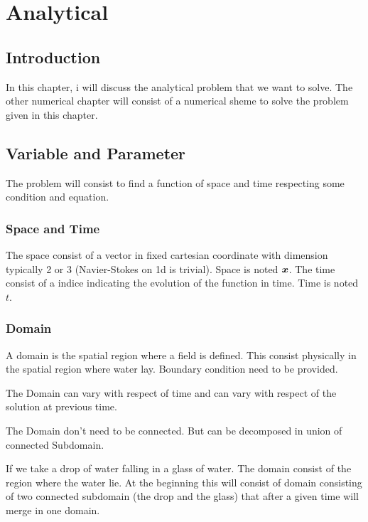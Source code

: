 \chapter{Analytical}
\minitoc
\section{Introduction}
In this chapter, i will discuss the analytical problem that we want to solve.
The other numerical chapter will consist of a numerical sheme to solve the problem given in this chapter.

\section{Variable and Parameter}

The problem will consist to find a function of space and time respecting some condition and equation.

\subsection{Space and Time}

The space consist of a vector in fixed cartesian coordinate with dimension typically 2 or 3 (Navier-Stokes on 1d is trivial).
Space is noted ${\boldsymbol {x}}$.
The time consist of a indice indicating the evolution of the function in time.
Time is noted $t$.

\subsection{Domain}

A domain is the spatial region where a field is defined. This consist physically in the spatial region where water lay.
Boundary condition need to be provided.

The Domain can vary with respect of time and can vary with respect of the solution at previous time.

The Domain don't need to be connected. But can be decomposed in union of connected Subdomain.

\begin{example}
 If we take a drop of water falling in a glass of water. The domain consist of the region where the water lie.
 At the beginning this will consist of domain consisting of two connected subdomain (the drop and the glass)
 that after a given time will merge in one domain.
\end{example}

